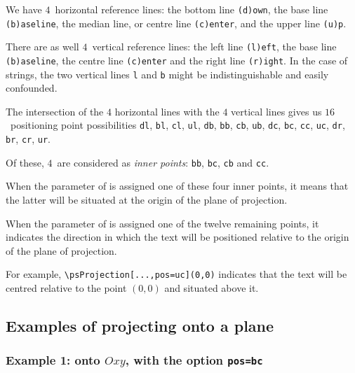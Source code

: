 We have $4$~horizontal reference lines: the bottom line
\verb+(d)own+, the base line \verb+(b)aseline+, the median line,
or centre line \verb+(c)enter+, and the upper line \verb+(u)p+.

There are as well $4$~vertical reference lines: the left line
\verb+(l)eft+, the base line \verb+(b)aseline+, the centre line
\verb+(c)enter+ and the right line \verb+(r)ight+. In the case of
strings, the two vertical lines \verb+l+ and \verb+b+ might be
indistinguishable and easily confounded.

The intersection of the $4$ horizontal lines with the $4$ vertical
lines gives us $16$~positioning point possibilities \verb+dl+,
\verb+bl+, \verb+cl+, \verb+ul+, \verb+db+, \verb+bb+, \verb+cb+,
\verb+ub+, \verb+dc+, \verb+bc+, \verb+cc+, \verb+uc+, \verb+dr+,
\verb+br+, \verb+cr+, \verb+ur+.

Of these, $4$~are considered as \textit{inner points}: \verb+bb+,
\verb+bc+, \verb+cb+ and \verb+cc+.

When the parameter  of  is assigned
one of these four inner points, it means that the latter will be
situated at the origin of the plane of projection.

When the parameter  of  is assigned
one of the twelve remaining points, it indicates the direction in
which the text will be positioned relative to the origin of the
plane of projection.

For example, \verb+\psProjection[...,pos=uc](0,0)+ indicates that
the text will be centred relative to the point $(0,0)$ and
situated above it.




\subsection{Examples of projecting onto a plane}

\subsubsection{Example 1:  onto $Oxy$, with the option \texttt{pos=bc}}

